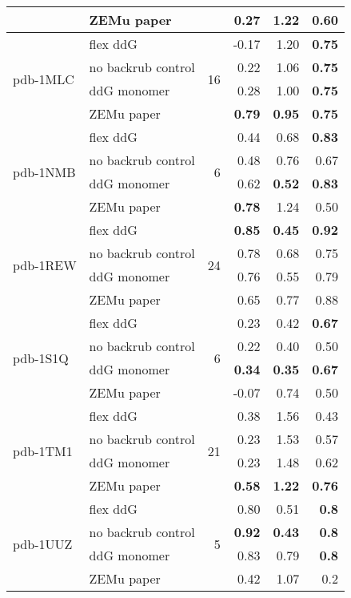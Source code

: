 \begin{table}
\begin{tabular}{llrrrr}
 & ZEMu paper & & 0.27 & 1.22 & 0.60  \\
\hline
 \multirow{ 4}{*}{pdb-1MLC} & flex ddG & \multirow{ 4}{*}{16} & -0.17 & 1.20 & \textbf{0.75}  \\
 & no backrub control & & 0.22 & 1.06 & \textbf{0.75}  \\
 & ddG monomer & & 0.28 & 1.00 & \textbf{0.75}  \\
 & ZEMu paper & & \textbf{0.79} & \textbf{0.95} & \textbf{0.75}  \\
\hline
 \multirow{ 4}{*}{pdb-1NMB} & flex ddG & \multirow{ 4}{*}{6} & 0.44 & 0.68 & \textbf{0.83}  \\
 & no backrub control & & 0.48 & 0.76 & 0.67  \\
 & ddG monomer & & 0.62 & \textbf{0.52} & \textbf{0.83}  \\
 & ZEMu paper & & \textbf{0.78} & 1.24 & 0.50  \\
\hline
 \multirow{ 4}{*}{pdb-1REW} & flex ddG & \multirow{ 4}{*}{24} & \textbf{0.85} & \textbf{0.45} & \textbf{0.92}  \\
 & no backrub control & & 0.78 & 0.68 & 0.75  \\
 & ddG monomer & & 0.76 & 0.55 & 0.79  \\
 & ZEMu paper & & 0.65 & 0.77 & 0.88  \\
\hline
 \multirow{ 4}{*}{pdb-1S1Q} & flex ddG & \multirow{ 4}{*}{6} & 0.23 & 0.42 & \textbf{0.67}  \\
 & no backrub control & & 0.22 & 0.40 & 0.50  \\
 & ddG monomer & & \textbf{0.34} & \textbf{0.35} & \textbf{0.67}  \\
 & ZEMu paper & & -0.07 & 0.74 & 0.50  \\
\hline
 \multirow{ 4}{*}{pdb-1TM1} & flex ddG & \multirow{ 4}{*}{21} & 0.38 & 1.56 & 0.43  \\
 & no backrub control & & 0.23 & 1.53 & 0.57  \\
 & ddG monomer & & 0.23 & 1.48 & 0.62  \\
 & ZEMu paper & & \textbf{0.58} & \textbf{1.22} & \textbf{0.76}  \\
\hline
 \multirow{ 4}{*}{pdb-1UUZ} & flex ddG & \multirow{ 4}{*}{5} & 0.80 & 0.51 & \textbf{0.8}  \\
 & no backrub control & & \textbf{0.92} & \textbf{0.43} & \textbf{0.8}  \\
 & ddG monomer & & 0.83 & 0.79 & \textbf{0.8}  \\
 & ZEMu paper & & 0.42 & 1.07 & 0.2  \\

\end{tabular}
\end{table}
